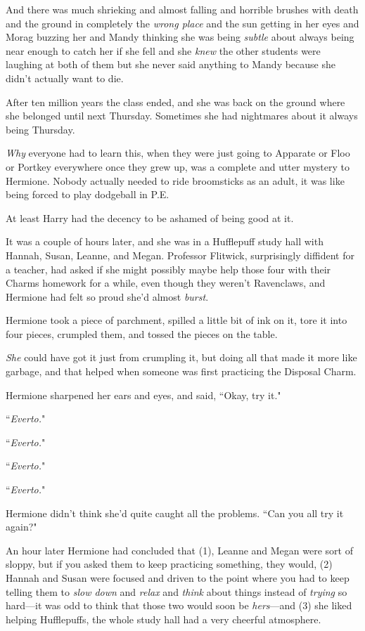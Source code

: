 And there was much shrieking and almost falling and horrible brushes with death and the ground in completely the \emph{wrong place} and the sun getting in her eyes and Morag buzzing her and Mandy thinking she was being \emph{subtle} about always being near enough to catch her if she fell and she \emph{knew} the other students were laughing at both of them but she never said anything to Mandy because she didn't actually want to die.

After ten million years the class ended, and she was back on the ground where she belonged until next Thursday. Sometimes she had nightmares about it always being Thursday.

\emph{Why} everyone had to learn this, when they were just going to Apparate or Floo or Portkey everywhere once they grew up, was a complete and utter mystery to Hermione. Nobody actually needed to ride broomsticks as an adult, it was like being forced to play dodgeball in P.E.

At least Harry had the decency to be ashamed of being good at it.

\later

It was a couple of hours later, and she was in a Hufflepuff study hall with Hannah, Susan, Leanne, and Megan. Professor Flitwick, surprisingly diffident for a teacher, had asked if she might possibly maybe help those four with their Charms homework for a while, even though they weren't Ravenclaws, and Hermione had felt so proud she'd almost \emph{burst}.

Hermione took a piece of parchment, spilled a little bit of ink on it, tore it into four pieces, crumpled them, and tossed the pieces on the table.

\emph{She} could have got it just from crumpling it, but doing all that made it more like garbage, and that helped when someone was first practicing the Disposal Charm.

Hermione sharpened her ears and eyes, and said, ``Okay, try it."

``\emph{Everto.}"

``\emph{Everto.}"

``\emph{Everto.}"

``\emph{Everto.}"

Hermione didn't think she'd quite caught all the problems. ``Can you all try it again?"

An hour later Hermione had concluded that (1), Leanne and Megan were sort of sloppy, but if you asked them to keep practicing something, they would, (2) Hannah and Susan were focused and driven to the point where you had to keep telling them to \emph{slow down} and \emph{relax} and \emph{think} about things instead of \emph{trying} so hard—it was odd to think that those two would soon be \emph{hers}—and (3) she liked helping Hufflepuffs, the whole study hall had a very cheerful atmosphere.

